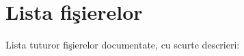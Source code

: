 \section{Lista fişierelor}
Lista tuturor fişierelor documentate, cu scurte descrieri\+:\begin{DoxyCompactList}
\item{}
\end{DoxyCompactList}
